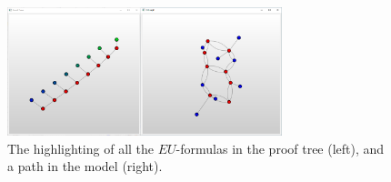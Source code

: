 \documentclass[runningheads]{llncs}
\begin{document}
\begin{figure}[h!]
\centering
\includegraphics[width=8cm]{./river_prooftreegraph_state_highlight.png}
\caption{The highlighting of all the $EU$-formulas in the proof tree (left), and a path in the model (right).}
\label{fig:river_path}
\end{figure}
\end{document}
